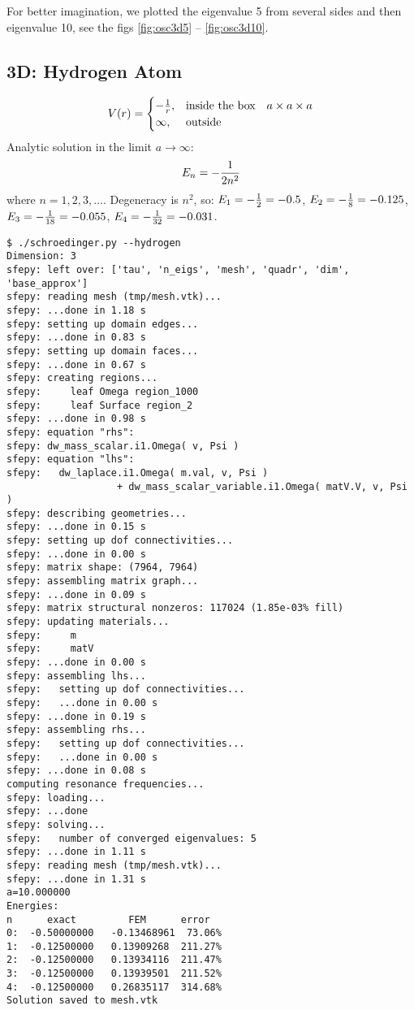 For better imagination, we plotted the eigenvalue 5 from several sides and then
eigenvalue 10, see the figs \ref{fig:osc3d5} -- \ref{fig:osc3d10}.





\subsection{3D: Hydrogen Atom}

$$V(r)=\begin{cases}-{1\over r},&\text{inside the box}\quad a\times a\times a \\
\infty, & \text{outside}\end{cases}$$
Analytic solution in the limit $a\to\infty$:
$$E_n=-{1\over2n^2}$$
where $n=1, 2, 3, \dots$.
Degeneracy is $n^2$, so:
$E_1 = -{1\over2}=-0.5$,
$E_2 = -{1\over8}=-0.125$,
$E_3 = -{1\over18}=-0.055$,
$E_4 = -{1\over32}=-0.031$.

\begin{lstlisting}
$ ./schroedinger.py --hydrogen
Dimension: 3
sfepy: left over: ['tau', 'n_eigs', 'mesh', 'quadr', 'dim', 'base_approx']
sfepy: reading mesh (tmp/mesh.vtk)...
sfepy: ...done in 1.18 s
sfepy: setting up domain edges...
sfepy: ...done in 0.83 s
sfepy: setting up domain faces...
sfepy: ...done in 0.67 s
sfepy: creating regions...
sfepy:     leaf Omega region_1000
sfepy:     leaf Surface region_2
sfepy: ...done in 0.98 s
sfepy: equation "rhs":
sfepy: dw_mass_scalar.i1.Omega( v, Psi )
sfepy: equation "lhs":
sfepy:   dw_laplace.i1.Omega( m.val, v, Psi )
                   + dw_mass_scalar_variable.i1.Omega( matV.V, v, Psi )
sfepy: describing geometries...
sfepy: ...done in 0.15 s
sfepy: setting up dof connectivities...
sfepy: ...done in 0.00 s
sfepy: matrix shape: (7964, 7964)
sfepy: assembling matrix graph...
sfepy: ...done in 0.09 s
sfepy: matrix structural nonzeros: 117024 (1.85e-03% fill)
sfepy: updating materials...
sfepy:     m
sfepy:     matV
sfepy: ...done in 0.00 s
sfepy: assembling lhs...
sfepy:   setting up dof connectivities...
sfepy:   ...done in 0.00 s
sfepy: ...done in 0.19 s
sfepy: assembling rhs...
sfepy:   setting up dof connectivities...
sfepy:   ...done in 0.00 s
sfepy: ...done in 0.08 s
computing resonance frequencies...
sfepy: loading...
sfepy: ...done
sfepy: solving...
sfepy:   number of converged eigenvalues: 5
sfepy: ...done in 1.11 s
sfepy: reading mesh (tmp/mesh.vtk)...
sfepy: ...done in 1.31 s
a=10.000000
Energies:
n      exact         FEM      error
0:  -0.50000000   -0.13468961  73.06%
1:  -0.12500000   0.13909268  211.27%
2:  -0.12500000   0.13934116  211.47%
3:  -0.12500000   0.13939501  211.52%
4:  -0.12500000   0.26835117  314.68%
Solution saved to mesh.vtk
\end{lstlisting}

